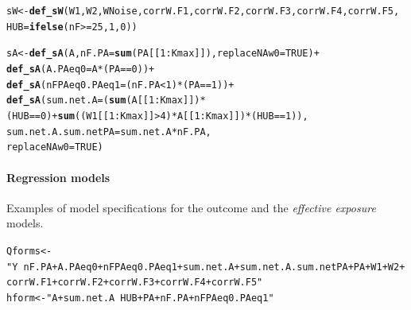 \documentclass[english]{article}\usepackage[]{graphicx}\usepackage[]{color}
\makeatletter
\newcommand{\hlnum}[1]{\textcolor[rgb]{0.686,0.059,0.569}{#1}}%
\newcommand{\hlstr}[1]{\textcolor[rgb]{0.192,0.494,0.8}{#1}}%
\newcommand{\hlopt}[1]{\textcolor[rgb]{0,0,0}{#1}}%
\newcommand{\hlstd}[1]{\textcolor[rgb]{0.345,0.345,0.345}{#1}}%
\newcommand{\hlkwb}[1]{\textcolor[rgb]{0.69,0.353,0.396}{#1}}%
\newcommand{\hlkwc}[1]{\textcolor[rgb]{0.333,0.667,0.333}{#1}}%
\newcommand{\hlkwd}[1]{\textcolor[rgb]{0.737,0.353,0.396}{\textbf{#1}}}%
\newenvironment{kframe}{%
 \def\at@end@of@kframe{}%
 \ifinner\ifhmode%
  \def\at@end@of@kframe{\end{minipage}}%
  \begin{minipage}{\columnwidth}%
 \fi\fi%
 \def\FrameCommand##1{\hskip\@totalleftmargin \hskip-\fboxsep
 \colorbox{shadecolor}{##1}\hskip-\fboxsep
     \hskip-\linewidth \hskip-\@totalleftmargin \hskip\columnwidth}%
 \MakeFramed {\advance\hsize-\width
   \@totalleftmargin\z@ \linewidth\hsize
   \@setminipage}}%
 {\par\unskip\endMakeFramed%
 \at@end@of@kframe}
\newenvironment{knitrout}{}{} %
\theoremstyle{plain}
\theoremstyle{plain}
\makeatother
\begin{document}
\begin{knitrout}\footnotesize
{}\color{fgcolor}\begin{kframe}
\begin{alltt}
\hlstd{sW} \hlkwb{<-}  \hlkwd{def_sW}\hlstd{(W1, W2, WNoise, corrW.F1, corrW.F2, corrW.F3, corrW.F4, corrW.F5,}
  \hlkwc{HUB} \hlstd{=} \hlkwd{ifelse}\hlstd{(nF} \hlopt{>=} \hlnum{25}\hlstd{,} \hlnum{1}\hlstd{,} \hlnum{0}\hlstd{))}
\end{alltt}


{\ttfamily\noindent\itshape\color{messagecolor}{\#\# Some summary measures were not named, automatic column name(s) will be generated during evaluation}}\begin{alltt}
\hlstd{sA} \hlkwb{<-}  \hlkwd{def_sA}\hlstd{(A,} \hlkwc{nF.PA} \hlstd{=} \hlkwd{sum}\hlstd{(PA[[}\hlnum{1}\hlopt{:}\hlstd{Kmax]]),} \hlkwc{replaceNAw0} \hlstd{=} \hlnum{TRUE}\hlstd{)} \hlopt{+}
 \hlkwd{def_sA}\hlstd{(}\hlkwc{A.PAeq0} \hlstd{= A} \hlopt{*} \hlstd{(PA} \hlopt{==} \hlnum{0}\hlstd{))} \hlopt{+}
 \hlkwd{def_sA}\hlstd{(}\hlkwc{nFPAeq0.PAeq1} \hlstd{= (nF.PA} \hlopt{<} \hlnum{1}\hlstd{)} \hlopt{*} \hlstd{(PA} \hlopt{==} \hlnum{1}\hlstd{))} \hlopt{+}
 \hlkwd{def_sA}\hlstd{(}\hlkwc{sum.net.A} \hlstd{= (}\hlkwd{sum}\hlstd{(A[[}\hlnum{1}\hlopt{:}\hlstd{Kmax]])}\hlopt{*}\hlstd{(HUB}\hlopt{==}\hlnum{0}\hlstd{)} \hlopt{+} \hlkwd{sum}\hlstd{((W1[[}\hlnum{1}\hlopt{:}\hlstd{Kmax]]} \hlopt{>} \hlnum{4}\hlstd{)}\hlopt{*}\hlstd{A[[}\hlnum{1}\hlopt{:}\hlstd{Kmax]])}\hlopt{*}\hlstd{(HUB}\hlopt{==}\hlnum{1}\hlstd{)),}
        \hlkwc{sum.net.A.sum.netPA} \hlstd{= sum.net.A}\hlopt{*}\hlstd{nF.PA,}
        \hlkwc{replaceNAw0} \hlstd{=} \hlnum{TRUE}\hlstd{)}
\end{alltt}


{\ttfamily\noindent\itshape\color{messagecolor}{\#\# Some summary measures were not named, automatic column name(s) will be generated during evaluation}}\end{kframe}
\end{knitrout}

\paragraph{Regression models}

Examples of model specifications for the outcome and the \textit{effective exposure} models.

\begin{knitrout}\footnotesize
{}\color{fgcolor}\begin{kframe}
\begin{alltt}
\hlstd{Qforms} \hlkwb{<-} \hlstr{"Y ~ nF.PA + A.PAeq0 + nFPAeq0.PAeq1 + sum.net.A + sum.net.A.sum.netPA + PA + W1 + W2 + corrW.F1 + corrW.F2 + corrW.F3 + corrW.F4 + corrW.F5"}
\hlstd{hform} \hlkwb{<-} \hlstr{"A + sum.net.A ~ HUB + PA + nF.PA + nFPAeq0.PAeq1"}
\end{alltt}
\end{kframe}
\end{knitrout}
\end{document}
